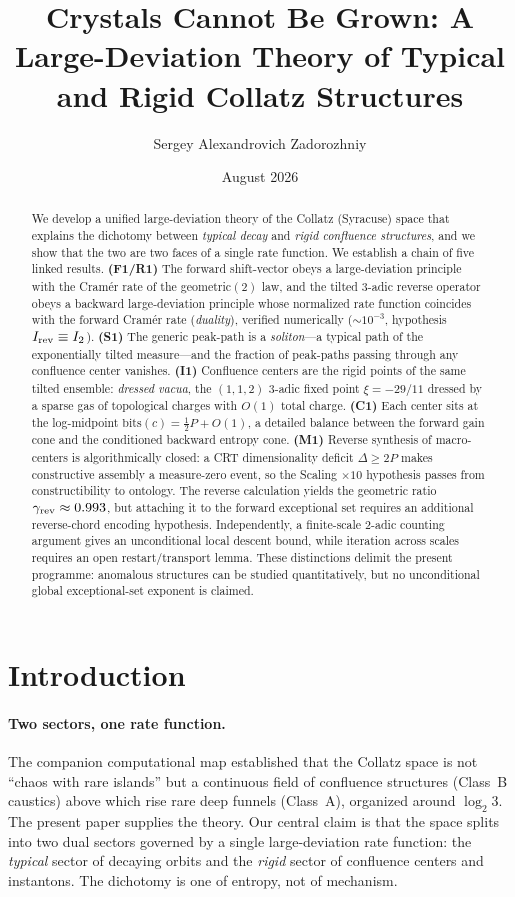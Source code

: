 \documentclass[12pt,a4paper]{article}
\title{Crystals Cannot Be Grown: A Large-Deviation Theory of Typical and Rigid Collatz Structures}
\author{Sergey Alexandrovich Zadorozhniy}
\date{August 2026}
\begin{document}
\maketitle

\begin{abstract}
We develop a unified large-deviation theory of the Collatz (Syracuse) space that
explains the dichotomy between \emph{typical decay} and \emph{rigid confluence
structures}, and we show that the two are two faces of a single rate function.
We establish a chain of five linked results.
\textbf{(F1/R1)} The forward shift-vector obeys a large-deviation principle with
the Cram\'er rate of the geometric$(2)$ law, and the tilted $3$-adic reverse
operator obeys a backward large-deviation principle whose normalized rate
function coincides with the forward Cram\'er rate (\emph{duality}), verified
numerically ($\sim 10^{-3}$, hypothesis $I_{\rm rev} \equiv I_2$).
\textbf{(S1)} The generic peak-path is a \emph{soliton}---a typical path of the
exponentially tilted measure---and the fraction of peak-paths passing through
any confluence center vanishes.
\textbf{(I1)} Confluence centers are the rigid points of the same tilted
ensemble: \emph{dressed vacua}, the $(1,1,2)$ $3$-adic fixed point
$\xi=-29/11$ dressed by a sparse gas of topological charges with $O(1)$ total
charge.
\textbf{(C1)} Each center sits at the log-midpoint
$\mathrm{bits}(c)=\tfrac12 P+O(1)$, a detailed balance between the forward gain
cone and the conditioned backward entropy cone.
\textbf{(M1)} Reverse synthesis of macro-centers is algorithmically closed: a
CRT dimensionality deficit $\Delta\ge2P$ makes constructive assembly a
measure-zero event, so the Scaling $\times10$ hypothesis passes from
constructibility to ontology.
The reverse calculation yields the geometric ratio
$\gamma_{\rm rev}\approx0.993$, but attaching it to the forward exceptional set
requires an additional reverse-chord encoding hypothesis.  Independently, a
finite-scale $2$-adic counting argument gives an unconditional local descent
bound, while iteration across scales requires an open restart/transport lemma.
These distinctions delimit the present programme: anomalous structures can be
studied quantitatively, but no unconditional global exceptional-set exponent is
claimed.
\end{abstract}

\section{Introduction}
\paragraph{Two sectors, one rate function.}
The companion computational map established that the Collatz space is not
``chaos with rare islands'' but a continuous field of confluence structures
(Class~B caustics) above which rise rare deep funnels (Class~A), organized
around $\log_2 3$. The present paper supplies the theory. Our central claim is
that the space splits into two dual sectors governed by a single
large-deviation rate function: the \emph{typical} sector of decaying orbits and
the \emph{rigid} sector of confluence centers and instantons. The dichotomy is
one of entropy, not of mechanism.
\end{document}
